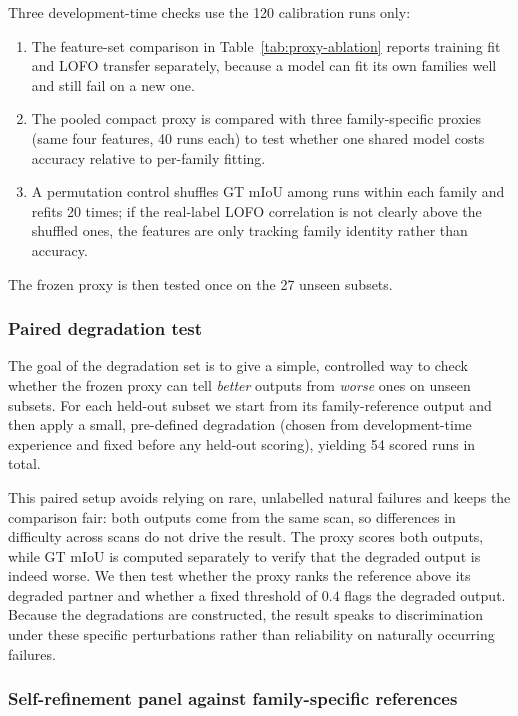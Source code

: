\documentclass[a4paper,fleqn]{cas-dc}
\begin{document}
{Three development-time checks use the 120 calibration runs only:
\begin{enumerate}
  \item The feature-set comparison in Table~\ref{tab:proxy-ablation} reports training fit and LOFO transfer separately, because a model can fit its own families well and still fail on a new one.
  \item The pooled compact proxy is compared with three family-specific proxies (same four features, 40 runs each) to test whether one shared model costs accuracy relative to per-family fitting.
  \item A permutation control shuffles GT mIoU among runs within each family and refits 20 times; if the real-label LOFO correlation is not clearly above the shuffled ones, the features are only tracking family identity rather than accuracy.
\end{enumerate}
The frozen proxy is then tested once on the 27 unseen subsets.


\subsubsection{Paired degradation test}
\label{sec:stress-test}

The goal of the degradation set is to give a simple, controlled way to check whether the frozen proxy can tell \emph{better} outputs from \emph{worse} ones on unseen subsets. For each held-out subset we start from its family-reference output and then apply a small, pre-defined degradation (chosen from development-time experience and fixed before any held-out scoring), yielding 54 scored runs in total.

This paired setup avoids relying on rare, unlabelled natural failures and keeps the comparison fair: both outputs come from the same scan, so differences in difficulty across scans do not drive the result. The proxy scores both outputs, while GT mIoU is computed separately to verify that the degraded output is indeed worse. We then test whether the proxy ranks the reference above its degraded partner and whether a fixed threshold of $0.4$ flags the degraded output. Because the degradations are constructed, the result speaks to discrimination under these specific perturbations rather than reliability on naturally occurring failures.


\subsubsection{Self-refinement panel against family-specific references}
\label{sec:poc-protocol}

}
\end{document}
